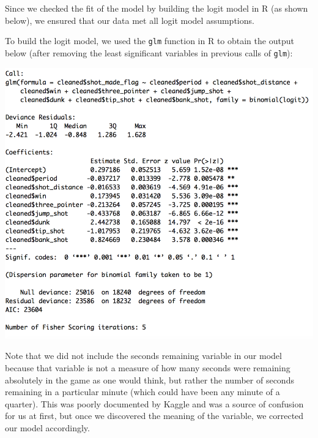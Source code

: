 \documentclass[paper=a4, fontsize=11pt]{scrartcl} %
\numberwithin{equation}{section} %
\numberwithin{figure}{section} %
\numberwithin{table}{section} %
\begin{document}
\hspace*{1cm}Since we checked the fit of the model by building the logit model in R (as shown below), we ensured that our data met all logit model assumptions. 

\hspace*{1cm}To build the logit model, we used the \texttt{glm} function in R to obtain the output below (after removing the least significant variables in previous calls of \texttt{glm}): 
\begin{center}
	\includegraphics[width=14cm]{img/logit1}
\end{center}

\hspace*{1cm}Note that we did not include the seconds remaining variable in our model because that variable is not a measure of how many seconds were remaining absolutely in the game as one would think, but rather the number of seconds remaining in a particular minute (which could have been any minute of a quarter). This was poorly documented by Kaggle and was a source of confusion for us at first, but once we discovered the meaning of the variable, we corrected our model accordingly.
\end{document}
